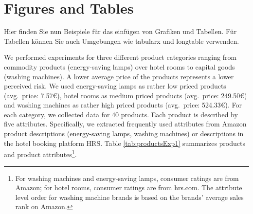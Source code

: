 \chapter{Figures and Tables} \label{chap:figuresTables}

Hier finden Sie nun Beispiele für das einfügen von Grafiken und Tabellen. Für Tabellen können Sie auch Umgebungen wie tabularx und longtable verwenden.

We performed experiments for three different product categories ranging from commodity products (energy-saving lamps) over hotel rooms to capital goods (washing machines). A lower average price of the products represents a lower perceived risk. We used energy-saving lamps as rather low priced products (avg.\ price: 7.57\euro), hotel rooms as medium priced products (avg.\ price: 249.50\euro) and washing machines as rather high priced products (avg.\ price: 524.33\euro). For each category, we collected data for 40 products. Each product is described by five attributes. Specifically, we extracted frequently used attributes from Amazon product descriptions (energy-saving lamps, washing machines) or descriptions in the hotel booking platform HRS. Table \ref{tab:productsExp1} summarizes products and product attributes\footnote{For washing machines and energy-saving lamps, consumer ratings are from Amazon; for hotel rooms, consumer ratings are from hrs.com. The attribute level order for washing machine brands is based on the brands' average sales rank on Amazon.}.

